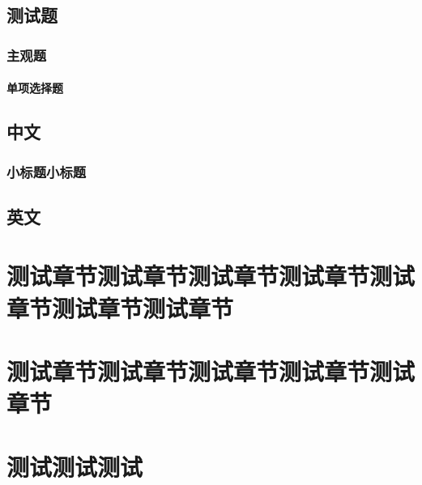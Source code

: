 \documentclass[color=green]{textbook-cn}%
\begin{document}
\begin{Test}
\chapter{测试题}


\begin{Definition}[定义名称]
	\lipsum[2]
\end{Definition}

\section{主观题}

\subsection{单项选择题}

\lipsum

\end{Test}



\begin{Appendix}
\chapter[WWWW]{中文}

\section[子附录测试]{小标题小标题}
\zhlipsum
	
\chapter{英文}
\zhlipsum
\end{Appendix}


\part{测试章节测试章节测试章节测试章节测试章节测试章节测试章节}
\part[测试章节]{测试章节测试章节测试章节测试章节测试章节}

\lipsum\lipsum


\part{测试测试测试}
\end{document}
